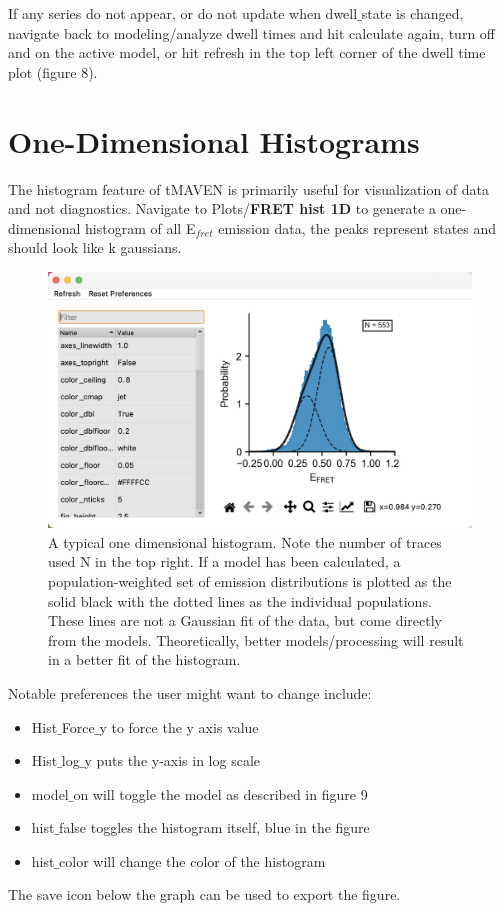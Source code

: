\documentclass[11pt,a5paper,footinclude=true,headinclude=true]{scrbook} %
\begin{document}
If any series do not appear, or do not update when dwell$\_$state is changed, navigate back to modeling/analyze dwell times and hit calculate again, turn off and on the active model, or hit refresh in the top left corner of the dwell time plot (figure 8).


\section{One-Dimensional Histograms}
The histogram feature of tMAVEN is primarily useful for visualization of data and not diagnostics. Navigate to Plots/\textbf{FRET hist 1D} to generate a one-dimensional histogram of all E$_{fret}$ emission data, the peaks represent states and should look like k gaussians. 

 \begin{figure} [h]
     \centering
     \includegraphics[scale=0.38]{1D Histofigure.png}
     \caption{A typical one dimensional histogram. Note the number of traces used N in the top right. If a model has been calculated, a population-weighted set of emission distributions is plotted as the solid black with the dotted lines as the individual populations. These lines are not a Gaussian fit of the data, but come directly from the models. Theoretically, better models/processing will result in a better fit of the histogram.}
     \label{fig:my_label}
 \end{figure}

 Notable preferences the user might want to change include:
\begin{itemize}
    \item Hist$\_$Force$\_$y to force the y axis value
    \item Hist$\_$log$\_$y puts the y-axis in log scale
    \item model$\_$on will toggle the model as described in figure 9
    \item hist$\_$false toggles the histogram itself, blue in the figure
    \item hist$\_$color will change the color of the histogram
\end{itemize}
The save icon below the graph can be used to export the figure. 
\end{document}
